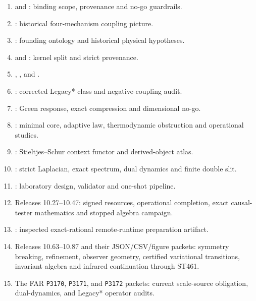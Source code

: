 \documentclass[11pt,a4paper]{article}
\theoremstyle{definition}
\theoremstyle{remark}
\begin{document}
\begingroup\small
\begin{enumerate}
\item {} and : binding scope, provenance and no-go guardrails.
\item {}: historical four-mechanism coupling picture.
\item {}: founding ontology and historical physical hypotheses.
\item {} and : kernel split and strict provenance.
\item {}, , and .
\item {}: corrected Legacy* class and negative-coupling audit.
\item {}: Green response, exact compression and dimensional no-go.
\item {}: minimal core, adaptive law, thermodynamic obstruction and operational studies.
\item {}: Stieltjes--Schur context functor and derived-object atlas.
\item {}: strict Laplacian, exact spectrum, dual dynamics and finite double slit.
\item {}: laboratory design, validator and one-shot pipeline.
\item Releases 10.27--10.47: signed resources, operational completion, exact causal-tester mathematics and stopped algebra campaign.
\item {}: inspected exact-rational remote-runtime preparation artifact.
\item Releases 10.63--10.87 and their JSON/CSV/figure packets: symmetry breaking, refinement, observer geometry, certified variational transitions, invariant algebra and infrared continuation through ST461.
\item The FAR \texttt{P3170}, \texttt{P3171}, and \texttt{P3172} packets: current scale-source obligation, dual-dynamics, and Legacy* operator audits.
\end{enumerate}
\endgroup
\end{document}
